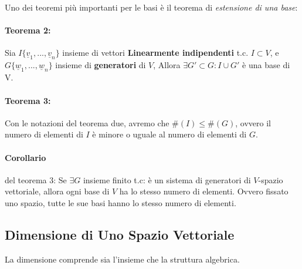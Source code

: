 
Uno dei teoremi più importanti per le basi è il teorema di \emph{estensione di una base}:
\paragraph{Teorema 2:}
Sia $I\{\underline{v}_1,...,\underline{v}_n\}$ insieme di vettori \textbf{Linearmente indipendenti} t.c. $I\subset V$,
e $G\{\underline{w}_1,...,\underline{w}_n\}$ insieme di \textbf{generatori} di $V$,
Allora $\exists G' \subset G : I \cup G'$ è una base di V.

\paragraph{Teorema 3:} Con le notazioni del teorema due, avremo che $\#(I) \leq \#(G)$, ovvero il numero di elementi di $I$ è minore o uguale al numero di elementi di $G$.

\paragraph{Corollario} del teorema 3:
Se $\exists G$ insieme finito t.c: è un sistema di generatori di $V$-spazio vettoriale, allora ogni base di $V$ ha lo stesso numero di elementi.
Ovvero fissato uno spazio, tutte le sue basi hanno lo stesso numero di elementi.


\subsection{Dimensione di Uno Spazio Vettoriale}
La dimensione comprende sia l'insieme che la struttura algebrica.

